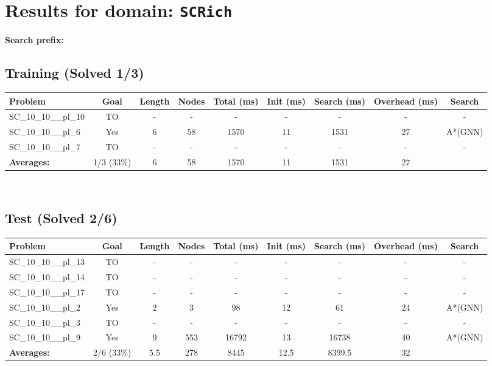 \documentclass{article}
\begin{document}
\section*{Results for domain: \texttt{SCRich}}
\textbf{Search prefix:} 
\\[0.5cm]
\subsection*{Training (Solved 1/3)}
\begin{tabular}{lcccccccc}
\toprule
Problem & Goal & Length & Nodes & Total (ms) & Init (ms) & Search (ms) & Overhead (ms) & Search \\
\midrule
SC\_10\_10\_\_pl\_10 & TO & - & - & - & - & - & - & - \\
SC\_10\_10\_\_pl\_6 & Yes & 6 & 58 & 1570 & 11 & 1531 & 27 & A*(GNN) \\
SC\_10\_10\_\_pl\_7 & TO & - & - & - & - & - & - & - \\
\textbf{Averages:} & 1/3 (33\%) & 6 & 58 & 1570 & 11 & 1531 & 27 & \\
\bottomrule
\end{tabular}
\\[0.7cm]
\subsection*{Test (Solved 2/6)}
\begin{tabular}{lcccccccc}
\toprule
Problem & Goal & Length & Nodes & Total (ms) & Init (ms) & Search (ms) & Overhead (ms) & Search \\
\midrule
SC\_10\_10\_\_pl\_13 & TO & - & - & - & - & - & - & - \\
SC\_10\_10\_\_pl\_14 & TO & - & - & - & - & - & - & - \\
SC\_10\_10\_\_pl\_17 & TO & - & - & - & - & - & - & - \\
SC\_10\_10\_\_pl\_2 & Yes & 2 & 3 & 98 & 12 & 61 & 24 & A*(GNN) \\
SC\_10\_10\_\_pl\_3 & TO & - & - & - & - & - & - & - \\
SC\_10\_10\_\_pl\_9 & Yes & 9 & 553 & 16792 & 13 & 16738 & 40 & A*(GNN) \\
\textbf{Averages:} & 2/6 (33\%) & 5.5 & 278 & 8445 & 12.5 & 8399.5 & 32 & \\
\bottomrule
\end{tabular}
\\[0.7cm]
\end{document}
